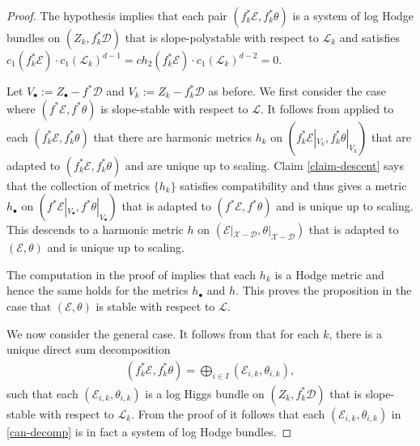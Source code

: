 \documentclass[a4paper]{amsart}
\theoremstyle{definition}
\begin{document}
\begin{proof}
The hypothesis implies that each pair $(f_k^*\mathcal{E},f_k^*\theta)$ is a system of log Hodge bundles on $(Z_k,f_k^*\mathscr{D})$ that is slope-polystable with respect to $\mathcal{L}_k$ and satisfies $c_1(f_k^*\mathcal{E})\cdot c_1(\mathcal{L}_k)^{d-1}=ch_2(f_k^*\mathcal{E})\cdot c_1(\mathcal{L}_k)^{d-2}=0$.

Let $V_\bullet:=Z_\bullet-f^*\mathscr{D}$ and $V_k:=Z_k-f_k^*\mathscr{D}$ as before. We first consider the case where $(f^*\mathcal{E},f^*\theta)$ is slope-stable with respect to $\mathcal{L}$. It follows from \cite[Theorem 9.4]{mochizuki_asterisque} applied to each $(f_k^*\mathcal{E},f_k^*\theta)$ that there are harmonic metrics $h_k$ on $(f_k^*\mathcal{E}|_{V_k},f_k^*\theta|_{V_k})$ that are adapted to $(f_k^*\mathcal{E},f_k^*\theta)$ and are unique up to scaling. Claim \ref{claim-descent} says that the collection of metrics $\{h_k\}$ satisfies compatibility and thus gives a metric $h_\bullet$ on $(f^*\mathcal{E}|_{V_\bullet},f^*\theta|_{V_\bullet})$ that is adapted to $(f^*\mathcal{E},f^*\theta)$ and is unique up to scaling. This descends to a harmonic metric $h$ on $(\mathcal{E}|_{\mathscr{X}-\mathscr{D}},\theta|_{\mathscr{X}-\mathscr{D}})$ that is adapted to $(\mathcal{E},\theta)$ and is unique up to scaling. 

The computation in the proof of \cite[Proposition 2.12]{dengcadorel} implies that each $h_k$ is a Hodge metric and hence the same holds for the metrics $h_\bullet$ and $h$. This proves the proposition in the case that $(\mathcal{E},\theta)$ is stable with respect to $\mathcal{L}$.  

We now consider the general case. It follows from \cite[Corollary 3.11]{mochizuki_asterisque} that for each $k$, there is a unique direct sum decomposition 
\begin{align}\label{can-decomp}
(f_k^*\mathcal{E},f_k^*\theta)=\bigoplus_{i\in I}(\mathcal{E}_{i,k},\theta_{i,k}),
\end{align}
such that each $(\mathcal{E}_{i,k},\theta_{i,k})$ is a log Higgs bundle on $(Z_k,f_k^*\mathscr{D})$ that is slope-stable with respect to $\mathcal{L}_k$. From the proof of \cite[Proposition 2.12]{dengcadorel} it follows that each $(\mathcal{E}_{i,k},\theta_{i,k})$ in \ref{can-decomp} is in fact a system of log Hodge bundles. 


\end{proof}
\end{document}
